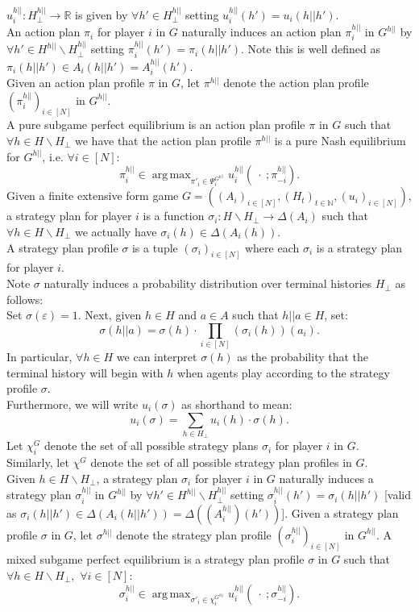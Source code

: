 \documentclass[11pt]{article}
\DeclareMathOperator*{\argmax}{arg\,max}
\theoremstyle{definition}
\theoremstyle{plain}
\begin{document}
$u^{h||}_i:H^{h||}_{\bot} \to \mathbb{R}$ is given by $\forall h' \in H^{h||}_\bot$ setting $u^{h||}_i(h')=u_i(h||h')$.
\\
An action plan $\pi_i$ for player $i$ in $G$ naturally induces an action plan $\pi^{h||}_i$ in $G^{h||}$ by $\forall h' \in H^{h||} \backslash H^{h||}_{\bot}$ setting $\pi_i^{h||}(h')=\pi_i(h||h').$ Note this is well defined as $\pi_i(h||h')\in A_i(h||h')=A^{h||}_i(h')$. 
\\
Given an action plan profile $\pi$ in $G$, let $\pi^{h||}$ denote the action plan profile $(\pi^{h||}_i)_{i \in [N]}$ in $G^{h||}$.
\\
A pure subgame perfect equilibrium is an action plan profile $\pi$ in $G$ such that $\forall h \in H \backslash H_{\bot}$ we have that the action plan profile $\pi^{h||}$ is a pure Nash equilibrium for $G^{h||}$, i.e. $\forall i \in [N]$:
$$\pi_i^{h||} \in \argmax_{\pi'_i \in \Psi_i^{G^{h||}}} u_i^{h||}(\ \cdot \ ; \pi^{h||}_{-i}).$$
Given a finite extensive form game $G=((A_i)_{i \in [N]},(H_t)_{t \in \mathbb{N}}, (u_i)_{i \in [N]})$, a strategy plan for player $i$ is a function $\sigma_i: H \backslash H_{\bot} \to \Delta(A_i)$ such that $\forall h  \in H \backslash H_{\bot}$ we actually have $\sigma_i(h) \in \Delta(A_i(h))$.
\\
A strategy plan profile $\sigma$ is a tuple $(\sigma_i)_{i \in [N]}$ where each $\sigma_i$ is a strategy plan for player $i$.
\\
Note $\sigma$ naturally induces a probability distribution over terminal histories $H_{\bot}$ as follows:
\\
Set $\sigma(\varepsilon)=1$. Next, given $h \in H$ and $ a \in A$ such that $h||a \in H$, set: 
$$\sigma(h||a)=\sigma(h) \cdot \prod_{i \in [N]} (\sigma_i(h))(a_i).$$
In particular, $\forall h \in H$ we can interpret $\sigma(h)$ as the probability that the terminal history will begin with $h$ when agents play according to the strategy profile $\sigma$.
\\
Furthermore, we will write $u_i(\sigma)$ as shorthand to mean:
$$u_i(\sigma)=\sum_{h \in H_\bot} u_i(h) \cdot \sigma(h).$$
Let $\chi^G_i$ denote the set of all possible strategy plans $\sigma_i$ for player $i$ in $G$.
\\
Similarly, let $\chi^G$ denote the set of all possible strategy plan profiles in $G$. 
\\
Given $h\in H\backslash H_{\bot}$, a strategy plan $\sigma_i$ for player $i$ in $G$ naturally induces a strategy plan $\sigma_i^{h||}$ in $G^{h||}$ by $\forall h' \in H^{h||} \backslash H^{h||}_{\bot}$ setting $\sigma_i^{h||}(h')=\sigma_i(h||h')$ [valid as $\sigma_i(h||h')\in \Delta(A_i(h||h'))=\Delta((A_i^{h||})(h'))$]. Given a strategy plan profile $\sigma$ in $G$, let $\sigma^{h||}$ denote the strategy plan profile $(\sigma^{h||}_{i})_{i \in[N]}$ in $G^{h||}$. A mixed subgame perfect equilibrium is a strategy plan profile $\sigma$ in $G$ such that $\forall h \in H \backslash H_{\bot},$
$\forall i \in[N]$:
$$\sigma^{h||}_i \in \argmax_{\sigma'_i \in \chi_i^{G^{h||}}} u^{h||}_i( \ \cdot \ ; \sigma_{-i}^{h||}).$$
\end{document}
